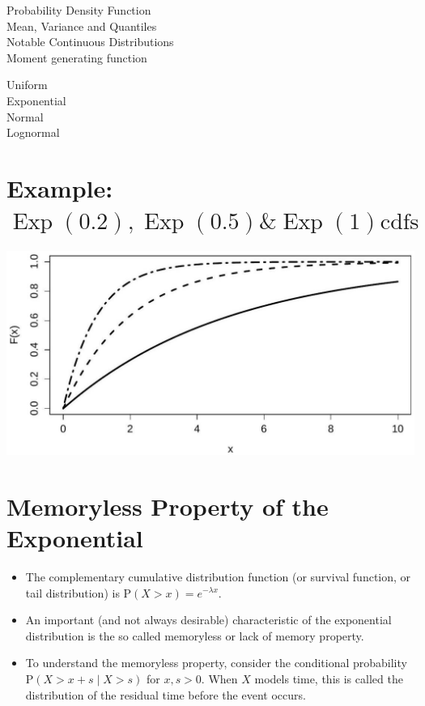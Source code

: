 \documentclass[10pt]{article}
\begin{document}
Probability Density Function\\
Mean, Variance and Quantiles\\
Notable Continuous Distributions\\
Moment generating function

Uniform\\
Exponential\\
Normal\\
Lognormal

\section*{Example: $\operatorname{Exp}(0.2), \operatorname{Exp}(0.5) \& \operatorname{Exp}(1) \mathrm{cdfs}$}
\begin{center}
\includegraphics[max width=\textwidth]{2025_05_11_1201cfe24e14b364b4ecg-24}
\end{center}

\section*{Memoryless Property of the Exponential}
\begin{itemize}
  \item The complementary cumulative distribution function (or survival function, or tail distribution) is $\mathrm{P}(X>x)=e^{-\lambda x}$.
  \item An important (and not always desirable) characteristic of the exponential distribution is the so called memoryless or lack of memory property.
  \item To understand the memoryless property, consider the conditional probability $\mathrm{P}(X>x+s \mid X>s)$ for $x, s>0$. When $X$ models time, this is called the distribution of the residual time before the event occurs.
\end{itemize}
\end{document}
